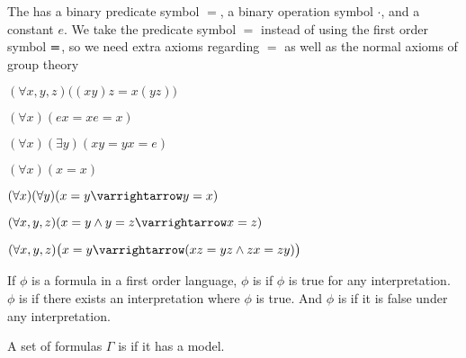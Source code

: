 \documentclass[10pt]{article}
\let\to=\varrightarrow
\def\beqq{\mathrel{\vbox{\hbox{$=$}\kern-\baselineskip\kern.3pt\hbox{$=$}}}}
\begin{document}
\begin{exam*}

    The  has a binary predicate symbol $=$, a binary operation symbol $\cdot$, and a constant $e$.
    We take the predicate symbol $=$ instead of using the first order symbol $\beqq$, so we need extra axioms regarding $=$ as well as the normal axioms of group theory
    \benum
        \item $(\forall x,y,z)\bigl((xy)z=x(yz)\bigr)$
        \item $(\forall x)(ex=xe=x)$
        \item $(\forall x)(\exists y)(xy=yx=e)$
        \item $(\forall x)(x=x)$
        \item $(\forall x)(\forall y)(x=y\to y=x)$
        \item $(\forall x,y,z)(x=y\land y=z\to x=z)$
        \item $(\forall x,y,z)\bigl(x=y\to(xz=yz\land zx=zy)\bigr)$
    \eenum

\end{exam*}

\begin{defn*}

    If $\phi$ is a formula in a first order language, $\phi$ is  if $\phi$ is true for any interpretation.
    $\phi$ is  if there exists an interpretation where $\phi$ is true.
    And $\phi$ is  if it is false under any interpretation.

    A set of formulas $\Gamma$ is  if it has a model.

\end{defn*}
\end{document}
